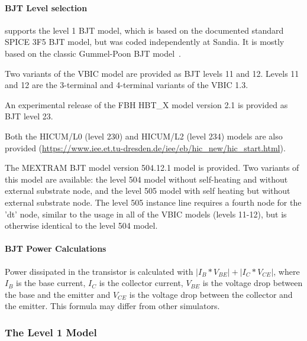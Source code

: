 \paragraph{BJT Level selection}

\Xyce{} supports the level 1 BJT model, which is based on the
documented standard SPICE 3F5 BJT model, but was coded independently
at Sandia.  It is mostly based on the classic Gummel-Poon BJT
model~\cite{GummelPoon}.

Two variants of the VBIC model are provided as BJT levels 11  and 12.
Levels 11 and 12 are the
3-terminal and 4-terminal variants of the VBIC 1.3.

An experimental release of the FBH HBT\_X model version
2.1\cite{Rudolph_documentationof} is provided as BJT level 23.

Both the HICUM/L0 (level 230) and HICUM/L2 (level 234) models are also
provided (\url{https://www.iee.et.tu-dresden.de/iee/eb/hic_new/hic_start.html}).

The MEXTRAM\cite{MEXTRAM_home} BJT model version 504.12.1 model is provided.
Two variants of this model are available: the level 504 model without
self-heating and without external substrate node, and the level 505 model with
self heating but without external substrate node.  The level 505 instance line
requires a fourth node for the 'dt' node, similar to the usage in all of the
VBIC models (levels 11-12), but is otherwise identical to the level 504 model.

\paragraph{BJT Power Calculations}
Power dissipated in the transistor is calculated with
$|I_{B}*V_{BE}|+|I_{C}*V_{CE}|$, where $I_{B}$ is the base current, $I_{C}$ is
the collector current, $V_{BE}$ is the voltage drop between the base and the
emitter and $V_{CE}$ is the voltage drop between the collector and the emitter.
This formula may differ from other simulators.

\subsubsection{The Level 1 Model}
